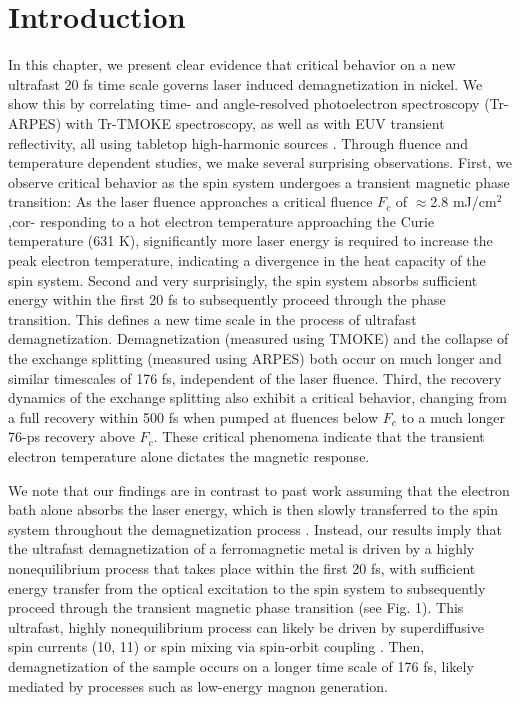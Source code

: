 \section{Introduction}

In this chapter, we present clear evidence that critical behavior on a new ultrafast 20 fs time scale governs laser induced demagnetization in nickel. We show this by correlating time- and angle-resolved photoelectron spectroscopy (Tr-ARPES) with Tr-TMOKE spectroscopy, as well as with EUV transient reflectivity, all using tabletop high-harmonic sources \cite{La-O-Vorakiat2012}. Through fluence and temperature dependent studies, we make several surprising observations. First, we observe critical behavior as the spin system undergoes a transient magnetic phase transition: As the laser fluence approaches a critical fluence $F_c$ of $\approx$2.8 mJ/cm$^2$,cor- responding to a hot electron temperature approaching the Curie temperature (631 K), significantly more laser energy is required to increase the peak electron temperature, indicating a divergence in the heat capacity of the spin system. Second and very surprisingly, the spin system absorbs sufficient energy within the first 20 fs to subsequently proceed through the phase transition. This defines a new time scale in the process of ultrafast demagnetization. Demagnetization (measured using TMOKE) and the collapse of the exchange splitting (measured using ARPES) both occur on much longer and similar timescales of 176 fs, independent of the laser fluence. Third, the recovery dynamics of the exchange splitting also exhibit a critical behavior, changing from a full recovery within 500 fs when pumped at fluences below $F_c$ to a much longer 76-ps recovery above $F_c$. These critical phenomena indicate that the transient electron temperature alone dictates the magnetic response.

We note that our findings are in contrast to past work assuming that the electron bath alone absorbs the laser energy, which is then slowly transferred to the spin system throughout the demagnetization process \cite{Koopmans2010,Bigot2009,Mueller2013,Roth2012}. Instead, our results imply that the ultrafast demagnetization of a ferromagnetic metal is driven by a highly nonequilibrium process that takes place within the first 20 fs, with sufficient energy transfer from the optical excitation to the spin system to subsequently proceed through the transient magnetic phase transition (see Fig. 1). This ultrafast, highly nonequilibrium process can likely be driven by superdiffusive spin currents (10, 11) or spin mixing via spin-orbit coupling \cite{Tows2015,Zhang2012,Krieger2015}. Then, demagnetization of the sample occurs on a longer time scale of 176 fs, likely mediated by processes such as low-energy magnon generation.

